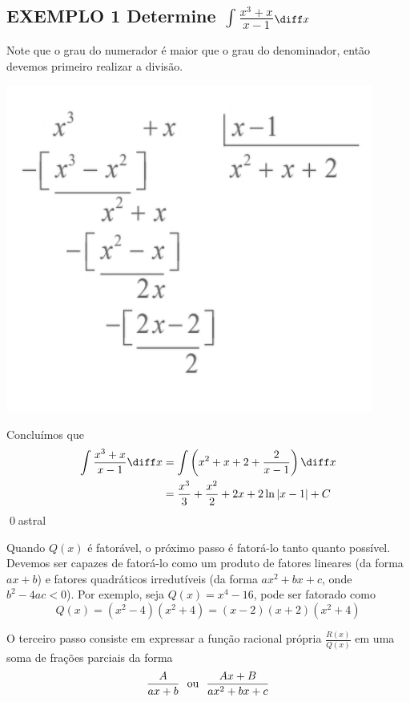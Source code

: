 \documentclass[a4paper, 12pt]{extreport}
\begin{document}
    \subsection*{\small {\color{astral}EXEMPLO 1} \textmd{Determine \large$\int{\frac{x^3+x}{x-1}}$\normalsize$\diff x$}}
      Note que o grau do numerador é maior que o grau do denominador, então devemos primeiro realizar a divisão.
      \begin{center}
        \includegraphics[scale=0.25]{poly-div}
      \end{center}
      Concluímos que
      \begin{equation*}
        \begin{split}
          \int{\frac{x^3+x}{x-1}\diff x} & = \int{\left(x^2+x+2+\frac{2}{x-1}\right)\diff x} \\
                                    & = \frac{x^3}{3} + \frac{x^2}{2} + 2x + 2\ln|x-1| + C
        \end{split}
      \end{equation*}
      \qed{astral}

    Quando $Q(x)$ é fatorável, o próximo passo é fatorá-lo tanto quanto possível. Devemos ser capazes de fatorá-lo como um produto
    de fatores lineares (da forma $ax + b$) e fatores quadráticos irredutíveis (da forma $ax^2 + bx + c$, onde $b^2 - 4ac < 0$).
    Por exemplo, seja $Q(x) = x^4-16$, pode ser fatorado como $$ Q(x) = (x^2-4)(x^2+4) = (x-2)(x+2)(x^2+4) $$

    O terceiro passo consiste em expressar a função racional própria $\frac{R(x)}{Q(x)}$ em uma soma de frações parciais da forma
    $$\frac{A}{ax+b} \ \ \textup{ou} \ \ \frac{Ax+B}{ax^2+bx+c}$$
\end{document}
